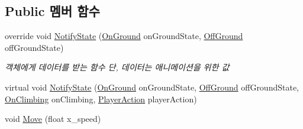 \subsection*{Public 멤버 함수}
\begin{DoxyCompactItemize}
\item 
override void \mbox{\hyperlink{class_player_state_a59f3f64c24ba1b6e34e34cb23746ecb0}{Notify\+State}} (\mbox{\hyperlink{class_state_ab9eb1c1d81f1903b8486d1275e78b68e}{On\+Ground}} on\+Ground\+State, \mbox{\hyperlink{class_state_a7d945e793324c017a973205564cf1a56}{Off\+Ground}} off\+Ground\+State)
\begin{DoxyCompactList}\small\item\em 객체에게 데이터를 받는 함수 단, 데이터는 애니메이션을 위한 값 \end{DoxyCompactList}\item 
virtual void \mbox{\hyperlink{class_player_state_a5fd8b8df346a045643621b312317de72}{Notify\+State}} (\mbox{\hyperlink{class_state_ab9eb1c1d81f1903b8486d1275e78b68e}{On\+Ground}} on\+Ground\+State, \mbox{\hyperlink{class_state_a7d945e793324c017a973205564cf1a56}{Off\+Ground}} off\+Ground\+State, \mbox{\hyperlink{class_player_state_a16e115e2b4c8d0420119d6ff2fe8b3bc}{On\+Climbing}} on\+Climbing, \mbox{\hyperlink{class_player_state_a2909421d9f22a750c1b0eacfc9bafb3d}{Player\+Action}} player\+Action)
\item 
void \mbox{\hyperlink{class_state_a4424d0f582fe05b9dc7cec2a0a7c735a}{Move}} (float x\+\_\+speed)
\end{DoxyCompactItemize}
